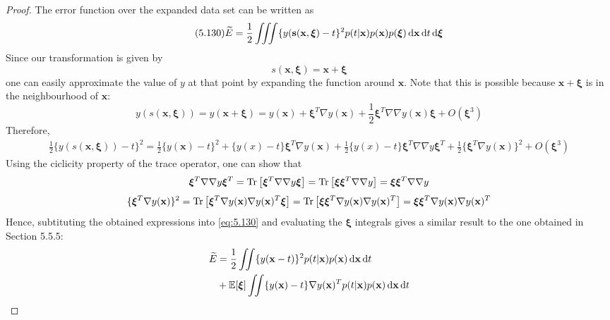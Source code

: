 \begin{proof}
    The error function over the expanded data set can be written as
    \begin{equation}\label{eq:5.130}\tag{5.130}
        \widetilde{E} 
        = \frac{1}{2} \iiint \{y(\mathbf{s}(\mathbf{x}, \bm{\xi}) - t\}^2 
        p(t | \mathbf{x}) p(\mathbf{x}) p(\bm{\xi}) \mathop{}\!\mathrm{d} \mathbf{x} \mathop{}\!\mathrm{d} t \mathop{}\!\mathrm{d} \bm{\xi}
    \end{equation}
    Since our transformation is given by
    \[
        s(\mathbf{x}, \bm{\xi}) = \mathbf{x} + \bm{\xi}
    \] 
    one can easily approximate the value of $y$ at that point by expanding
    the function around $\mathbf{x}$. Note that this is possible because 
    $\mathbf{x} + \bm{\xi}$ is in the neighbourhood of $\mathbf{x}$:
    \[
        y(s(\mathbf{x}, \bm{\xi})) 
        = y(\mathbf{x} + \bm{\xi})
        = y(\mathbf{x}) + \bm{\xi}^T \nabla y(\mathbf{x}) 
        + \frac{1}{2} \bm{\xi}^T \nabla \nabla y(\mathbf{x}) \bm{\xi}
        + O(\bm{\xi}^3)
    \] 
    Therefore, 
    \begin{align*}
    \frac{1}{2}\{y(s(\mathbf{x}, \bm{\xi})) - t\}^2
        = \frac{1}{2}\{y(\mathbf{x}) - t\}^2 +  \{y(x) - t\}\bm{\xi}^T \nabla y(\mathbf{x})
        + \frac{1}{2}\{y(x) - t\} \bm{\xi}^T \nabla \nabla y \bm{\xi}^T + \frac{1}{2}\{\bm{\xi}^T 
        \nabla y(\mathbf{x})\}^2 + O(\bm{\xi}^3)
    \end{align*}
    Using the ciclicity property of the trace operator, one can show that
    \[
        \bm{\xi}^T \nabla \nabla y \bm{\xi}^T
        = \Trace \big[\bm{\xi}^T \nabla \nabla y \bm{\xi}\big]
        = \Trace \big[\bm{\xi} \bm{\xi}^T \nabla \nabla y\big]
        = \bm{\xi} \bm{\xi}^T \nabla \nabla y
    \] 
    \[
        \{\bm{\xi}^T \nabla y(\mathbf{x})\}^2
        = \Trace\big[\bm{\xi}^T \nabla y(\mathbf{x}) \nabla y(\mathbf{x})^T \bm{\xi}\big]
        = \Trace\big[\bm{\xi} \bm{\xi}^T \nabla y(\mathbf{x}) \nabla y(\mathbf{x})^T\big]
        = \bm{\xi} \bm{\xi}^T \nabla y(\mathbf{x}) \nabla y(\mathbf{x})^T
    \] 
    Hence, subtituting the obtained expressions into \eqref{eq:5.130} and evaluating
    the $\bm{\xi}$ integrals gives a similar result to the one obtained in Section 5.5.5:
    \begin{align*}
        \widetilde{E} 
        &= \frac{1}{2} \iint \{y(\mathbf{x} - t)\}^2 p(t | \mathbf{x}) p(\mathbf{x}) \diff \mathbf{x} \diff t \\
        &+ \mathbb{E}[\bm{\xi}] \iint \{y(\mathbf{x}) - t\} \nabla y(\mathbf{x})^T 
            p(t | \mathbf{x}) p(\mathbf{x}) \diff \mathbf{x} \diff t  \\

\end{align*}
\end{proof}
